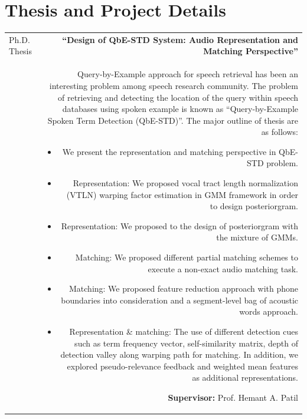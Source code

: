 \documentclass[10pt]{article}
\begin{document}
\section*{Thesis and Project Details}
\begin{tabular}{L!{\VRule}R}
Ph.D. Thesis&\textbf{``Design of QbE-STD System: Audio Representation and Matching Perspective''}\\& Query-by-Example approach for speech retrieval has been an interesting problem among speech research community. The problem of retrieving and detecting the location of the query within speech databases using spoken example is known as ``Query-by-Example Spoken Term Detection (QbE-STD)''. The major outline of thesis are as follows: \vspace{-0.3cm}\begin{itemize}
	\setlength\itemsep{0em}
	\item We present the representation and matching perspective in QbE-STD problem.
	\item Representation: We proposed vocal tract length normalization (VTLN) warping factor estimation in GMM framework in order to design posteriorgram.
	\item Representation: We proposed to the design of posteriorgram with the mixture of GMMs.
	\item Matching: We proposed different partial matching schemes to execute a non-exact audio matching task. 
	\item Matching: We proposed feature reduction approach with phone boundaries into consideration and a segment-level bag of acoustic words approach. 
	\item Representation \& matching: The use of different detection cues such as term frequency vector, self-similarity matrix, depth of detection valley along warping path for matching. In addition, we explored pseudo-relevance feedback and weighted mean features as additional representations.  
\end{itemize} \textbf{Supervisor:} Prof. Hemant A. Patil \vspace{0.5cm}\\


\end{tabular}
\end{document}
